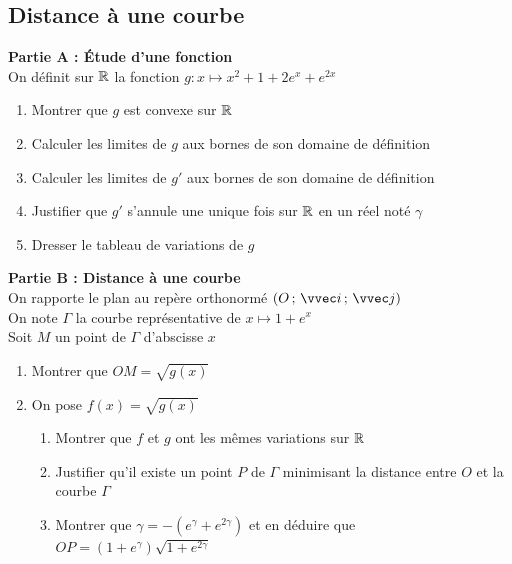 \documentclass[oneside,12pt]{book}          %
\begin{document}
\subsection{Distance à une courbe}
\textbf{Partie A : Étude d'une fonction}\\
On définit sur ${\mathbb R}$ la fonction $g:x\mapsto x^2+1+2e^x+e^{2x}$
\begin{enumerate}
    \item Montrer que $g$ est convexe sur ${\mathbb R}$
    \item Calculer les limites de $g$ aux bornes de son domaine de définition
    \item Calculer les limites de $g'$ aux bornes de son domaine de définition
    \item Justifier que $g'$ s'annule une unique fois sur ${\mathbb R}$ en un réel noté $\gamma$
    \item Dresser le tableau de variations de $g$
\end{enumerate}

\textbf{Partie B : Distance à une courbe}\\
On rapporte le plan au repère orthonormé $\Oij$\\
On note $\Gamma$ la courbe représentative de $x\mapsto1+e^x$\\
Soit $M$ un point de $\Gamma$ d'abscisse $x$
\begin{enumerate}
    \item Montrer que $OM=\sqrt{g(x)}$
    \item On pose $f(x)=\sqrt{g(x)}$
    \begin{enumerate}
        \item Montrer que $f$ et $g$ ont les mêmes variations sur ${\mathbb R}$
        \item Justifier qu'il existe un point $P$ de $\Gamma$ minimisant la distance entre $O$ et la courbe $\Gamma$
        \item  Montrer que $\gamma=-(e^\gamma+e^{2\gamma})$ et en déduire que $OP=(1+e^\gamma)\sqrt{1+e^{2\gamma}}$
    \end{enumerate}
\end{enumerate}
\end{document}
